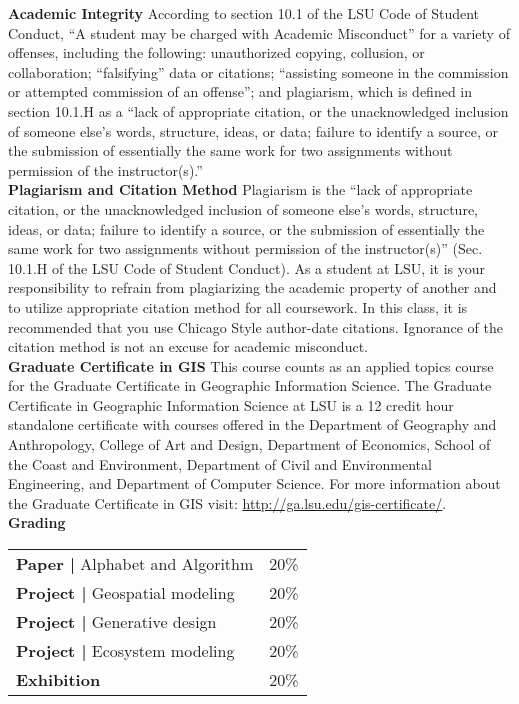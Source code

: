 \documentclass[11pt,article,oneside]{memoir}
\begin{document}
\noindent \textbf{Academic Integrity}
According to section 10.1 of the LSU Code of Student Conduct, ``A student may be charged with Academic Misconduct'' for a variety of offenses, including the following: unauthorized copying, collusion, or collaboration; ``falsifying'' data or citations; ``assisting someone in the commission or attempted commission of an offense''; and plagiarism, which is defined in section 10.1.H as a ``lack of appropriate citation, or the unacknowledged inclusion of someone else's words, structure, ideas, or data; failure to identify a source, or the submission of essentially the same work for two assignments without permission of the instructor(s).''\\

\noindent \textbf{Plagiarism and Citation Method}
Plagiarism is the ``lack of appropriate citation, or the unacknowledged inclusion of someone else's words, structure, ideas, or data; failure to identify a source, or the submission of essentially the same work for two assignments without permission of the instructor(s)'' (Sec. 10.1.H of the LSU Code of Student Conduct). As a student at LSU, it is your responsibility to refrain from plagiarizing the academic property of another and to utilize appropriate citation method for all coursework. In this class, it is recommended that you use Chicago Style author-date citations. Ignorance of the citation method is not an excuse for academic misconduct.\\ 

\noindent \textbf{Graduate Certificate in GIS}
This course counts as an applied topics course for the 
Graduate Certificate in Geographic Information Science.
The Graduate Certificate in Geographic Information Science at LSU 
is a 12 credit hour standalone certificate with courses offered 
in the Department of Geography and Anthropology, College of Art and Design, 
Department of Economics, School of the Coast and Environment, 
Department of Civil and Environmental Engineering, 
and Department of Computer Science. 
For more information about the Graduate Certificate in GIS visit: 
\url{http://ga.lsu.edu/gis-certificate/}. \\

\noindent \textbf{Grading}
%
\begin{table}[H]
\small
\begin{tabular}{l l}
%
\textbf{Paper |} Alphabet and Algorithm & 20\% \\
\textbf{Project |} Geospatial modeling & 20\% \\
\textbf{Project |} Generative design & 20\% \\
\textbf{Project |} Ecosystem modeling & 20\% \\
\textbf{Exhibition} & 20\% \\
%
\end{tabular}
\end{table}
\end{document}
